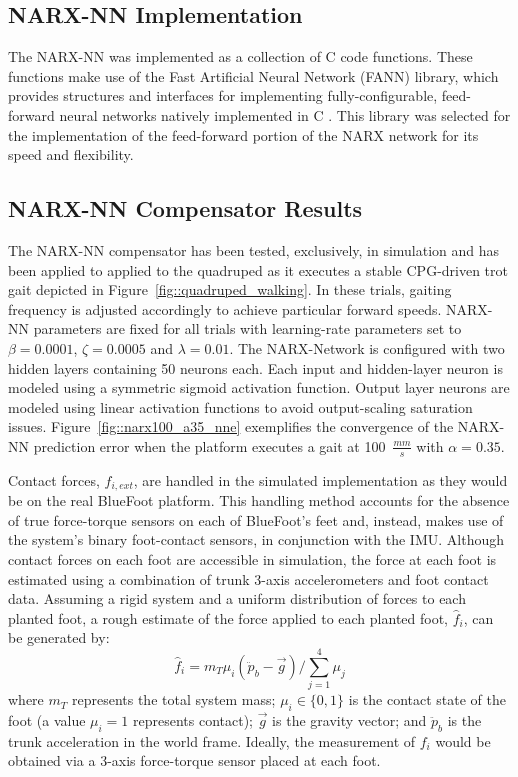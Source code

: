 		\subsection{NARX-NN Implementation}

			The NARX-NN was implemented as a collection of C code functions. These functions make use of the Fast Artificial Neural Network (FANN) library, which provides structures and interfaces for implementing fully-configurable, feed-forward neural networks natively implemented in C \cite{Nissen03}. This library was selected for the implementation of the feed-forward portion of the NARX network for its speed and flexibility. 


		\subsection{NARX-NN Compensator Results}

			The NARX-NN compensator has been tested, exclusively, in simulation and has been applied to applied to the quadruped as it executes a stable CPG-driven trot gait depicted in Figure~\ref{fig::quadruped_walking}. In these trials, gaiting frequency is adjusted accordingly to achieve particular forward speeds. NARX-NN parameters are fixed for all trials with learning-rate  parameters set to $\beta=0.0001$, $\zeta=0.0005$ and $\lambda = 0.01$. The NARX-Network is configured with two hidden layers containing 50 neurons each. Each input and hidden-layer neuron is modeled using a symmetric sigmoid activation function. Output layer neurons are modeled using linear activation functions to  avoid output-scaling saturation issues. Figure~\ref{fig::narx100_a35_nne} exemplifies the convergence of the NARX-NN prediction error when the platform executes a gait at  100~$\frac{mm}{s}$ with $\alpha = 0.35$.

			Contact forces, ${f}_{i,ext}$, are handled in the simulated implementation as they would be on the real BlueFoot platform. This handling method accounts for the absence of true force-torque sensors on each of BlueFoot's feet and, instead, makes use of the system's binary foot-contact sensors, in conjunction with the IMU. Although contact forces on each foot are accessible in simulation, the force at each foot is estimated using a combination of trunk 3-axis accelerometers and foot contact data. Assuming a rigid system and a uniform distribution of forces to each planted foot, a rough estimate of the force applied to each \Ith planted foot, $\hat{f}_{i}$, can be generated by:
				\begin{equation}
					\hat{f}_{i} = {m_{T}\mu_{i}} \left(\ddot{p}_{b} - \vec{g}\right)/{\sum_{j=1}^{4}{\mu_{j}}}
				\end{equation}
			where $m_{T}$ represents the total system mass; $\mu_{i}\in \{0,1\}$ is the contact state of the \Ith
			foot (a value $\mu_{i}=1$ represents contact); $\vec{g}$ is the gravity vector; and $\ddot{p}_{b}$ is the trunk acceleration in the world frame. Ideally, the measurement of ${f}_{i}$ would be obtained via a 3-axis force-torque sensor placed at each foot.

